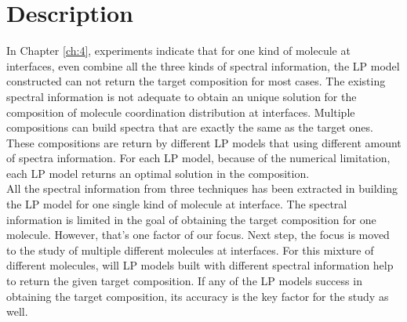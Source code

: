  \label{ch:5}
\section{Description}

In Chapter \ref{ch:4}, experiments indicate that for one kind of molecule at interfaces, even combine all the three kinds of spectral information, the LP model constructed can not return the target composition for most cases. The existing spectral information is not adequate to obtain an unique solution for the composition of molecule coordination distribution at interfaces. Multiple compositions can build spectra that are exactly the same as the target ones. These compositions are return by different LP models that using different amount of spectra information. For each LP model, because of the numerical limitation, each LP model returns an optimal solution in the composition. \\





All the spectral information from three techniques has been extracted in building the LP model for one single kind of molecule at interface. The spectral information is limited in the goal of obtaining the target composition for one molecule. However, that's one factor of our focus. Next step, the focus is moved to the study of multiple different molecules at interfaces. For this mixture of different molecules, will LP models built with different spectral information help to return the given target composition. If any of the LP models success in obtaining the target composition, its accuracy is the key factor for the study as well. \\


